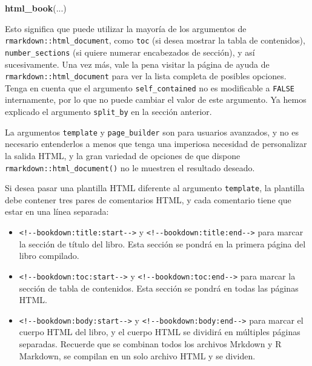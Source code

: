 \documentclass[12pt,]{krantz}
\makeatletter
\newenvironment{Shaded}{\begin{snugshade}}{\end{snugshade}}
\newcommand{\KeywordTok}[1]{\textcolor[rgb]{0.13,0.29,0.53}{\textbf{#1}}}
\newcommand{\NormalTok}[1]{#1}
\providecommand{\tightlist}{%
  \setlength{\itemsep}{0pt}\setlength{\parskip}{0pt}}
\newenvironment{kframe}{%
\medskip{}
\setlength{\fboxsep}{.8em}
 \def\at@end@of@kframe{}%
 \ifinner\ifhmode%
  \def\at@end@of@kframe{\end{minipage}}%
  \begin{minipage}{\columnwidth}%
 \fi\fi%
 \def\FrameCommand##1{\hskip\@totalleftmargin \hskip-\fboxsep
 \colorbox{shadecolor}{##1}\hskip-\fboxsep
     \hskip-\linewidth \hskip-\@totalleftmargin \hskip\columnwidth}%
 \MakeFramed {\advance\hsize-\width
   \@totalleftmargin\z@ \linewidth\hsize
   \@setminipage}}%
 {\par\unskip\endMakeFramed%
 \at@end@of@kframe}
\renewenvironment{Shaded}{\begin{kframe}}{\end{kframe}}
\theoremstyle{definition}
\theoremstyle{definition}
\theoremstyle{definition}
\theoremstyle{remark}
\makeatother
\begin{document}
\begin{Shaded}
\begin{Highlighting}[]
\KeywordTok{html_book}\NormalTok{(...)}
\end{Highlighting}
\end{Shaded}

Esto significa que puede utilizar la mayoría de los argumentos de
\texttt{rmarkdown::html\_document}, como \texttt{toc} (si desea mostrar
la tabla de contenidos), \texttt{number\_sections} (si quiere numerar
encabezados de sección), y así sucesivamente. Una vez más, vale la pena
visitar la página de ayuda de \texttt{rmarkdown::html\_document} para
ver la lista completa de posibles opciones. Tenga en cuenta que el
argumento \texttt{self\_contained} no es modificable a \texttt{FALSE}
internamente, por lo que no puede cambiar el valor de este argumento. Ya
hemos explicado el argumento \texttt{split\_by} en la sección anterior.

La argumentos \texttt{template} y \texttt{page\_builder} son para
usuarios avanzados, y no es necesario entenderlos a menos que tenga una
imperiosa necesidad de personalizar la salida HTML, y la gran variedad
de opciones de que dispone \texttt{rmarkdown::html\_document()} no le
muestren el resultado deseado.

Si desea pasar una plantilla HTML diferente al argumento
\texttt{template}, la plantilla debe contener tres pares de comentarios
HTML, y cada comentario tiene que estar en una línea separada:

\begin{itemize}
\tightlist
\item
  \texttt{\textless{}!-\/-bookdown:title:start-\/-\textgreater{}} y
  \texttt{\textless{}!-\/-bookdown:title:end-\/-\textgreater{}} para
  marcar la sección de título del libro. Esta sección se pondrá en la
  primera página del libro compilado.
\item
  \texttt{\textless{}!-\/-bookdown:toc:start-\/-\textgreater{}} y
  \texttt{\textless{}!-\/-bookdown:toc:end-\/-\textgreater{}} para
  marcar la sección de tabla de contenidos. Esta sección se pondrá en
  todas las páginas HTML.
\item
  \texttt{\textless{}!-\/-bookdown:body:start-\/-\textgreater{}} y
  \texttt{\textless{}!-\/-bookdown:body:end-\/-\textgreater{}} para
  marcar el cuerpo HTML del libro, y el cuerpo HTML se dividirá en
  múltiples páginas separadas. Recuerde que se combinan todos los
  archivos Mrkdown y R Markdown, se compilan en un solo archivo HTML y
  se dividen.
\end{itemize}
\end{document}
